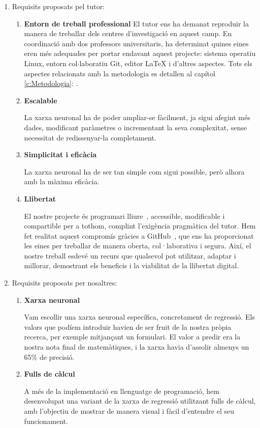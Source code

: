 \begin{enumerate}
\item Requisits proposats pel tutor:
\begin{enumerate}
\item \textbf{Entorn de treball professional}
    El tutor ens ha demanat reproduir la manera de treballar dels centres d'investigació en aquest camp. En coordinació amb dos professors universitaris, ha determinat quines eines eren més adequades per portar endavant aquest projecte: sistema operatiu Linux, entorn col$\cdot$laboratiu Git, editor LaTeX i d'altres aspectes. Tots els aspectes relacionats amb la metodologia es detallen al capítol \ref{c:Metodologia}: .

    \item \textbf{Escalable}

    La xarxa neuronal ha de poder ampliar-se fàcilment, ja sigui afegint més dades, modificant paràmetres o incrementant la seva complexitat, sense necessitat de redissenyar-la completament.

    \item \textbf{Simplicitat i eficàcia}

    La xarxa neuronal ha de ser tan simple com sigui possible, però alhora amb la màxima eficàcia.

    \item \textbf{Llibertat}

    El nostre projecte és programari lliure~\cite{ProgramariLliure}, accessible, modificable i compartible per a tothom, complint l’exigència pragmàtica del tutor. Hem fet realitat aquest compromís gràcies a GitHub~\cite{GitHub}, que ens ha proporcionat les eines per treballar de manera oberta, col·laborativa i segura. Així, el nostre treball esdevé un recurs que qualsevol pot utilitzar, adaptar i millorar, demostrant els beneficis i la viabilitat de la llibertat digital.
\end{enumerate}

\item Requisits proposats per nosaltres:
\begin{enumerate}
\item \textbf{Xarxa neuronal}

    Vam escollir una xarxa neuronal específica, concretament de regressió. Els valors que podíem introduir havien de ser fruit de la nostra pròpia recerca, per exemple mitjançant un formulari. El valor a predir era la nostra nota final de matemàtiques, i la xarxa havia d’assolir almenys un 65\% de precisió.

    \item \textbf{Fulls de càlcul}

    A més de la implementació en llenguatge de programació, hem desenvolupat una variant de la xarxa de regressió utilitzant fulls de càlcul, amb l’objectiu de mostrar de manera visual i fàcil d’entendre el seu funcionament.
\end{enumerate}

\end{enumerate}
%
